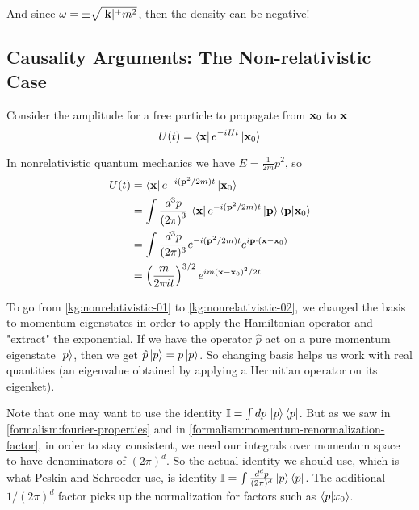 And since $\omega = \pm \sqrt{|\boldsymbol{\mathbf{k}}|^ + m^2}$, then the density can be negative!





\subsection{Causality Arguments: The Non-relativistic Case}

Consider the amplitude for a free particle to propagate from $\boldsymbol{\mathbf{x}}_0$ to $\boldsymbol{\mathbf{x}}$
$$
U(t) = \bra{\boldsymbol{\mathbf{x}}} e^{-iHt} \ket{\boldsymbol{\mathbf{x}}_0}
$$

In nonrelativistic quantum mechanics we have $E = \frac{1}{2m} p^2$, so
\begin{align}
U(t) &= \bra{\boldsymbol{\mathbf{x}}} e^{-i(\boldsymbol{\mathbf{p}}^2/2m)t} \ket{\boldsymbol{\mathbf{x}}_0} \label{kg:nonrelativistic-01} \\
&= \int \frac{d^3p}{\left(2\pi\right)^3} \, \bra{\boldsymbol{\mathbf{x}}} e^{-i(\boldsymbol{\mathbf{p}}^2/2m)t} \ket{\boldsymbol{\mathbf{p}}} \braket{\boldsymbol{\mathbf{p}} | \boldsymbol{\mathbf{x}}_0} \label{kg:nonrelativistic-02} \\
&= \int \frac{d^3p}{(2\pi)^3} e^{-i(\boldsymbol{\mathbf{p}}^2/2m)t} e^{i\boldsymbol{\mathbf{p}}\cdot(\boldsymbol{\mathbf{x}}-\boldsymbol{\mathbf{x}}_0)} \label{kg:nonrelativistic-03} \\
&= \left( \frac{m}{2\pi i t} \right)^{3/2} e^{im (\boldsymbol{\mathbf{x}}-\boldsymbol{\mathbf{x}}_0)^2 /2t} \label{kg:nonrelativistic-04}
\end{align}


To go from \ref{kg:nonrelativistic-01} to \ref{kg:nonrelativistic-02},
we changed the basis to momentum eigenstates in order to apply the Hamiltonian operator and "extract" the exponential.
If we have the operator $\hat{p}$ act on a pure momentum eigenstate $\ket{p}$, then we get $\hat{p}\ket{p} = p\ket{p}$.
So changing basis helps us work with real quantities
(an eigenvalue obtained by applying a Hermitian operator on its eigenket).

Note that one may want to use the identity $\mathbb{I} = \int dp\, \ket{p}\bra{p}$.
But as we saw in \ref{formalism:fourier-properties} and in \ref{formalism:momentum-renormalization-factor}, in order to stay consistent, we need our integrals over
momentum space to have denominators of $\left(2\pi\right)^d$.
So the actual identity we should use, which is what Peskin and Schroeder use, is identity
$\mathbb{I} = \int \frac{d^dp}{(2\pi)^d} \ket{p}\bra{p}$.
The additional $1/(2\pi)^d$ factor picks up the normalization for factors such as $\braket{p | x_0}$.



